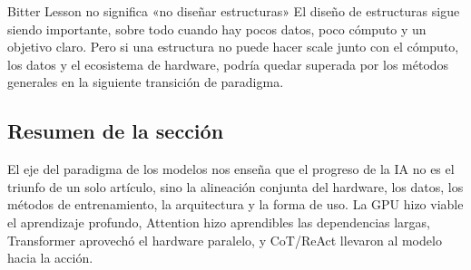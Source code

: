 \begin{warningbox}{Bitter Lesson no significa «no diseñar estructuras»}
El diseño de estructuras sigue siendo importante, sobre todo cuando hay pocos datos, poco cómputo y un objetivo claro. Pero si una estructura no puede hacer scale junto con el cómputo, los datos y el ecosistema de hardware, podría quedar superada por los métodos generales en la siguiente transición de paradigma.
\end{warningbox}

\subsection{Resumen de la sección}

El eje del paradigma de los modelos nos enseña que el progreso de la IA no es el triunfo de un solo artículo, sino la alineación conjunta del hardware, los datos, los métodos de entrenamiento, la arquitectura y la forma de uso. La GPU hizo viable el aprendizaje profundo, Attention hizo aprendibles las dependencias largas, Transformer aprovechó el hardware paralelo, y CoT/ReAct llevaron al modelo hacia la acción.
